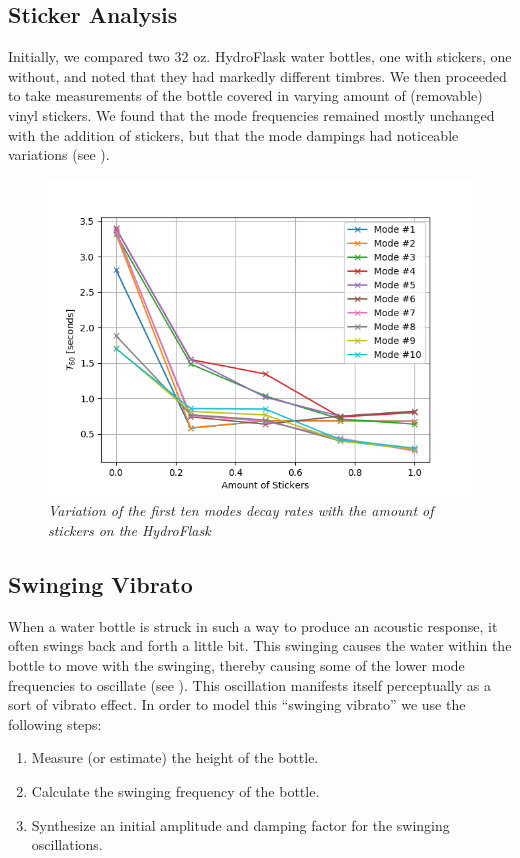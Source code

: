 \documentclass[twoside,a4paper]{article}
\begin{document}
\subsection{Sticker Analysis} \label{sec:sticker}
%
Initially, we compared two 32 oz. HydroFlask water bottles, one
with stickers, one without, and noted that they had markedly different
timbres. We then proceeded to take measurements of the
bottle covered in varying amount of (removable) vinyl stickers. We found
that the mode frequencies remained mostly unchanged with the
addition of stickers, but that the mode dampings had noticeable
variations (see ).
%
\begin{figure}[!htb]
    \centering
    \includegraphics[width=\linewidth,trim={0 0 1cm 1cm},clip]{../Figures/StickerDamping}
    \caption{\it{Variation of the first ten modes decay rates
                 with the amount of stickers on the HydroFlask}}
    \label{fig:sticker-mode-damp}
\end{figure}
%
\subsection{Swinging Vibrato} \label{sec:swing}
%
When a water bottle is struck in such a way to produce an acoustic
response, it often swings back and forth a little bit. This swinging
causes the water within the bottle to move with the swinging, thereby
causing some of the lower mode frequencies to oscillate (see
). This oscillation
manifests itself perceptually as a sort of vibrato effect. In
order to model this ``swinging vibrato'' we use the following
steps:
\begin{enumerate}
    \item Measure (or estimate) the height of the bottle.
    \item Calculate the swinging frequency of the bottle.
    \item Synthesize an initial amplitude and damping factor
        for the swinging oscillations.
\end{enumerate}
%
\end{document}
